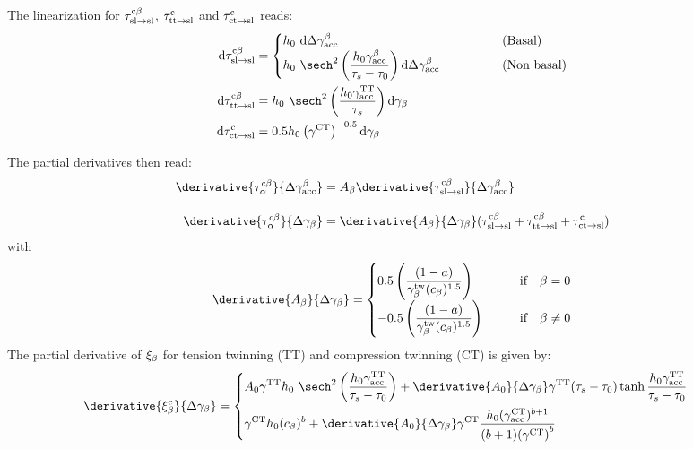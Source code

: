   The linearization for $\tau^{\rm c\beta}_{\rm sl\rightarrow sl}$, $\tau^{\rm c}_{\rm tt\rightarrow sl}$ and $\tau^{\rm c}_{\rm ct\rightarrow sl}$ reads: 
  \begin{align}
          \rmd\tauCslslb &= 
          \begin{cases}  \displaystyle h_0 \ \rmd\Delta\gammaaccb & \qquad \qquad \text{(Basal)} 
            \\ \displaystyle h_0 \ \sech^2\left(\frac{h_0 \gammaaccb}{\taus - \tauO}\right) \rmd\Delta\gammaaccb & \qquad \qquad \text{(Non basal)}
          \end{cases}\\
          \rmd\tauCttslb &= \hO \ \sech^2\left(\frac{\hO\gammaacctt}{\taus}\right) \rmd\gammab \\
          \rmd\tauCctsl &= 0.5 \hO \left(\gammact\right)^{-0.5} \rmd\gammab
  \end{align}
  
  The partial derivatives then read:
  \begin{align}
    \derivative{\tauacb}{\Delta\gammaaccb} & = \Ab \derivative{\tauCslslb}{\Delta\gammaaccb} \\[10pt]
    \derivative{\tauacb}{\Delta\gammab} & = \derivative{\Ab}{\Delta\gammab} (\tauCslslb + \tauCttslb + \tauCctsl)
  \end{align}
  with
  \begin{equation}
    \derivative{\Ab}{\Delta\gammab} = 
    \begin{cases}
      \displaystyle 0.5 \left( \frac{(1-a)}{\gammatwb(\cb)^{1.5}} \right) & \qquad \text{if} \quad \beta = 0  \\
      \displaystyle - 0.5 \left( \frac{(1-a)}{\gammatwb(\cb)^{1.5}} \right) & \qquad \text{if} \quad \beta \neq 0  
    \end{cases}
  \end{equation}
  The partial derivative of $\xi_\beta$ for tension twinning (TT) and compression twinning (CT) is given by:
  \begin{equation}
    \derivative{\xibc}{\Delta\gammab} = 
    \begin{cases}
      \displaystyle A_0 \gammatt \hO \ \sech^2\left(\frac{\hO \gammaacctt}{\taus-\tauO}\right) + \derivative{A_0}{\Delta\gammab}  \gammatt (\taus-\tauO) \tanh{\frac{\hO \gammaacctt}{\taus-\tauO}}  \\[10pt]
      \displaystyle \gammact \hO (\cb)^{b} + \derivative{A_0}{\Delta\gammab} \gammact \frac{\hO (\gammaaccct)^{b+1}}{(b+1){(\gammact)}^b}  
    \end{cases}
  \end{equation}
  
